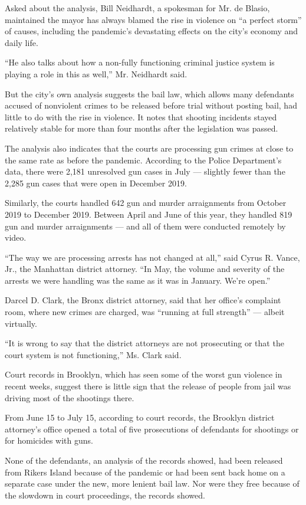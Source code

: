 Asked about the analysis, Bill Neidhardt, a spokesman for Mr. de Blasio,
maintained the mayor has always blamed the rise in violence on ``a
perfect storm'' of causes, including the pandemic's devastating effects
on the city's economy and daily life.

``He also talks about how a non-fully functioning criminal justice
system is playing a role in this as well,'' Mr. Neidhardt said.

But the city's own analysis suggests the bail law, which allows many
defendants accused of nonviolent crimes to be released before trial
without posting bail, had little to do with the rise in violence. It
notes that shooting incidents stayed relatively stable for more than
four months after the legislation was passed.

The analysis also indicates that the courts are processing gun crimes at
close to the same rate as before the pandemic. According to the Police
Department's data, there were 2,181 unresolved gun cases in July ---
slightly fewer than the 2,285 gun cases that were open in December 2019.

Similarly, the courts handled 642 gun and murder arraignments from
October 2019 to December 2019. Between April and June of this year, they
handled 819 gun and murder arraignments --- and all of them were
conducted remotely by video.

``The way we are processing arrests has not changed at all,'' said Cyrus
R. Vance, Jr., the Manhattan district attorney. ``In May, the volume and
severity of the arrests we were handling was the same as it was in
January. We're open.''

Darcel D. Clark, the Bronx district attorney, said that her office's
complaint room, where new crimes are charged, was ``running at full
strength'' --- albeit virtually.

``It is wrong to say that the district attorneys are not prosecuting or
that the court system is not functioning,'' Ms. Clark said.

Court records in Brooklyn, which has seen some of the worst gun violence
in recent weeks, suggest there is little sign that the release of people
from jail was driving most of the shootings there.

From June 15 to July 15, according to court records, the Brooklyn
district attorney's office opened a total of five prosecutions of
defendants for shootings or for homicides with guns.

None of the defendants, an analysis of the records showed, had been
released from Rikers Island because of the pandemic or had been sent
back home on a separate case under the new, more lenient bail law. Nor
were they free because of the slowdown in court proceedings, the records
showed.

